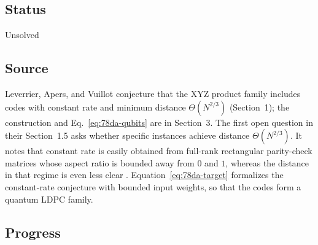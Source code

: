\subsection*{Status}

Unsolved

\subsection*{Source}

Leverrier, Apers, and Vuillot conjecture that the XYZ product family includes codes with constant rate and minimum distance $\Theta(N^{2/3})$ (Section~1); the construction and Eq.~\eqref{eq:78da-qubits} are in Section~3. The first open question in their Section~1.5 asks whether specific instances achieve distance $\Theta(N^{2/3})$. It notes that constant rate is easily obtained from full-rank rectangular parity-check matrices whose aspect ratio is bounded away from $0$ and $1$, whereas the distance in that regime is even less clear . Equation~\eqref{eq:78da-target} formalizes the constant-rate conjecture with bounded input weights, so that the codes form a quantum LDPC family.

\subsection*{Progress}

